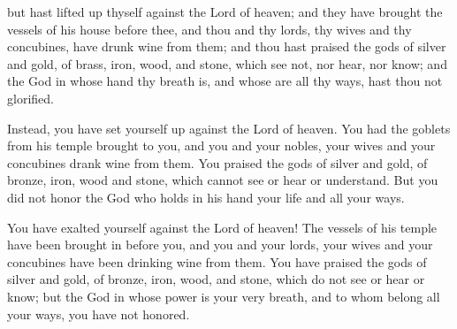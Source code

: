 			\begin{versebox}
					\item[BHS] 
					\item[LXX] 
					\item[ASV] but hast lifted up thyself against the Lord of heaven; and they have brought the vessels of his house before thee, and thou and thy lords, thy wives and thy concubines, have drunk wine from them; and thou hast praised the gods of silver and gold, of brass, iron, wood, and stone, which see not, nor hear, nor know; and the God in whose hand thy breath is, and whose are all thy ways, hast thou not glorified.
					\item[NIV] Instead, you have set yourself up against the Lord of heaven. You had the goblets from his temple brought to you, and you and your nobles, your wives and your concubines drank wine from them. You praised the gods of silver and gold, of bronze, iron, wood and stone, which cannot see or hear or understand. But you did not honor the God who holds in his hand your life and all your ways.
					\item[NRSV] You have exalted yourself against the Lord of heaven! The vessels of his temple have been brought in before you, and you and your lords, your wives and your concubines have been drinking wine from them. You have praised the gods of silver and gold, of bronze, iron, wood, and stone, which do not see or hear or know; but the God in whose power is your very breath, and to whom belong all your ways, you have not honored.
			\end{versebox}

